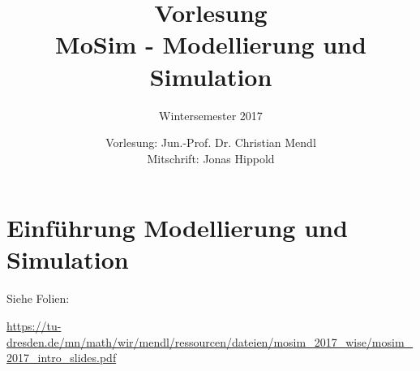 \documentclass[
 a4paper,
 12pt,
 parskip=half
 ]{scrreprt}
\title{Vorlesung\\MoSim - Modellierung und Simulation}
\subtitle{Wintersemester 2017}
\author{Vorlesung: Jun.-Prof. Dr. Christian Mendl\\Mitschrift: Jonas Hippold}
\theoremstyle{plain}
\theoremstyle{definition}
\begin{document}
\maketitle

\tableofcontents

\chapter{Einführung Modellierung und Simulation}
Siehe Folien:

\url{https://tu-dresden.de/mn/math/wir/mendl/ressourcen/dateien/mosim_2017_wise/mosim_2017_intro_slides.pdf}



\clearpage



\clearpage






\end{document}
